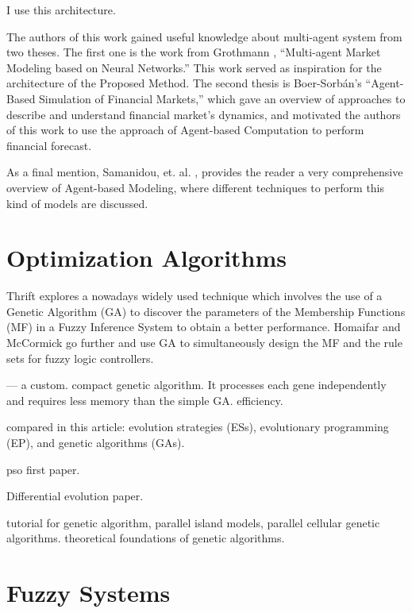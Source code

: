 \cite{Shoham2009} I use this architecture.

The authors of this work gained useful knowledge about multi-agent system from
two theses. The first one is the work from Grothmann \cite{Grothmann2002},
``Multi-agent Market Modeling based on Neural Networks.'' This work served as
inspiration for the architecture of the Proposed Method. The second thesis is
Boer-Sorb{\'{a}}n's ``Agent-Based Simulation of Financial Markets,'' which gave
an overview of approaches to describe and understand financial market's
dynamics, and motivated the authors of this work to use the approach of
Agent-based Computation to perform financial forecast.

As a final mention, Samanidou, et. al. \cite{Samanidou_2007}, provides the
reader a very comprehensive overview of Agent-based Modeling, where different
techniques to perform this kind of models are discussed.

\section{Optimization Algorithms}
\label{section:optimization-algorithms}

Thrift \cite{Thrift1991} explores a nowadays widely used technique which
involves the use of a Genetic Algorithm (GA) to discover the parameters of the
Membership Functions (MF) in a Fuzzy Inference System to obtain a better
performance. Homaifar and McCormick \cite{Homaifar1995} go further and use GA to
simultaneously design the MF and the rule sets for fuzzy logic controllers.


\cite{Harik1999} — a custom. compact genetic algorithm. It processes each gene
independently and requires less memory than the simple GA. efficiency.

\cite{Back2008} compared in this article: evolution strategies (ESs), evolutionary
programming (EP), and genetic algorithms (GAs).

\cite{Eberhart2002} pso first paper.

\cite{Price1997} Differential evolution paper.

\cite{Whitley1994} tutorial for genetic algorithm, parallel island models, parallel cellular
genetic algorithms. theoretical foundations of genetic algorithms.


\section{Fuzzy Systems}
\label{section:fuzzy-systems}

